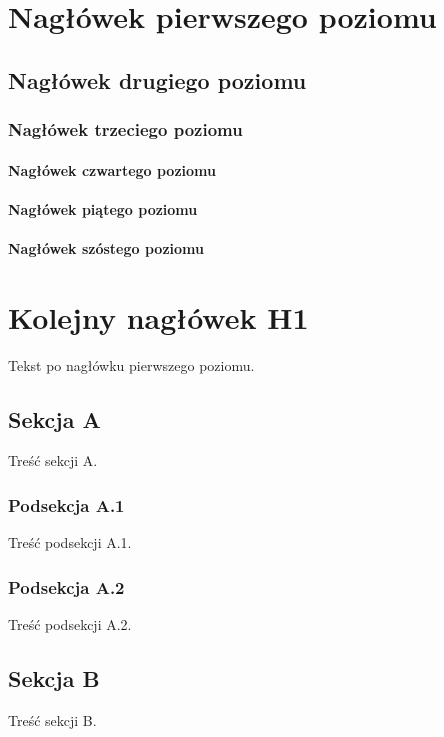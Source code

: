 \documentclass{article}
\begin{document}
\section{Nagłówek pierwszego poziomu}



\subsection{Nagłówek drugiego poziomu}



\subsubsection{Nagłówek trzeciego poziomu}



\paragraph{Nagłówek czwartego poziomu}



\paragraph{Nagłówek piątego poziomu}



\paragraph{Nagłówek szóstego poziomu}



\section{Kolejny nagłówek H1}



Tekst po nagłówku pierwszego poziomu.




\subsection{Sekcja A}



Treść sekcji A.




\subsubsection{Podsekcja A.1}



Treść podsekcji A.1.




\subsubsection{Podsekcja A.2}



Treść podsekcji A.2.




\subsection{Sekcja B}



Treść sekcji B.
\end{document}
